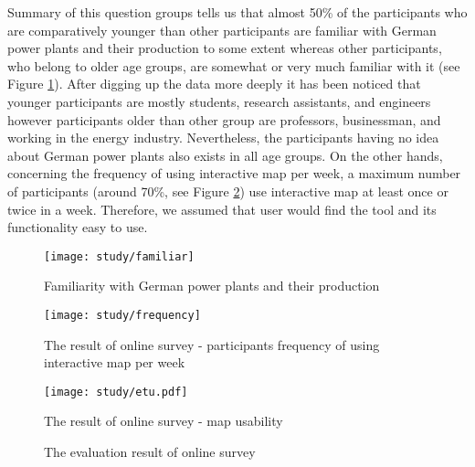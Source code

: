 Summary of this question groups tells us that almost 50\% of the participants who are comparatively younger than other participants are familiar with German power plants and their production to some extent whereas other participants, who belong to older age groups, are somewhat or very much familiar with it (see Figure \ref{fig:familiar}). After digging up the data more deeply it has been noticed that younger participants are mostly students, research assistants, and engineers however participants older than other group are professors, businessman, and working in the energy industry. Nevertheless, the participants having no idea about German power plants also exists in all age groups. On the other hands, concerning the frequency of using interactive map per week, a maximum number of participants (around 70\%, see Figure \ref{fig:mapUsage}) use interactive map at least once or twice in a week. Therefore, we assumed that user would find the tool and its functionality easy to use.

\begin{figure}
  \begin{center}
    \texttt{[image: study/familiar]}
    \caption{Familiarity with German power plants and their production}
    \label{fig:familiar}
  \end{center}
\end{figure}

\begin{figure} 
  \begin{center}
    \texttt{[image: study/frequency]}
    \caption{The result of online survey - participants frequency of using interactive map per week}
    \label{fig:mapUsage}
  \end{center}
\end{figure}

\begin{figure}
  \begin{center}
    \texttt{[image: study/etu.pdf]}
    \caption{The result of online survey - map usability}
    \label{fig:etu}
  \end{center}
\end{figure}

\begin{figure}
  \begin{center}
\hfill
{}
\hfill
\caption{The evaluation result of online survey}
\label{fig:selfExp}
\end{center}
\end{figure}


